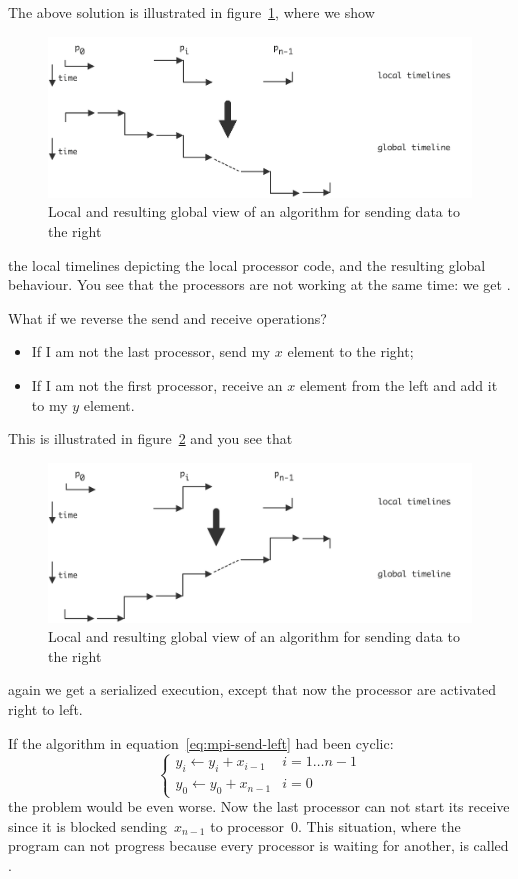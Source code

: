 The above solution is illustrated in figure~\ref{fig:wave_right_1},
where we show
\begin{figure}
  \includegraphics[scale=.14]{graphics/wave_right_1}
  \caption{Local and resulting global view of an algorithm for sending
    data to the right}
  \label{fig:wave_right_1}
\end{figure}
the local timelines depicting the local processor code, and the resulting
global behaviour. You see that the processors are not working at the
same time: we get .

What if we reverse the send and receive operations?
\begin{itemize}
\item If I am not the last processor, send my $x$ element to the
  right;
\item If I am not the first processor, receive an $x$ element from the
  left and add it to my $y$ element.
\end{itemize}
This is illustrated in figure~\ref{fig:wave_right_2} and you see that
\begin{figure}
  \includegraphics[scale=.14]{graphics/wave_right_2}
  \caption{Local and resulting global view of an algorithm for sending
    data to the right}
  \label{fig:wave_right_2}
\end{figure}
again we get a serialized execution, except that now the processor are
activated right to left.

If the algorithm in equation~\ref{eq:mpi-send-left} had been cyclic:
\begin{equation}
\begin{cases}
y_i\leftarrow y_i+x_{i-1}&i=1\ldots n-1\\ 
y_0\leftarrow y_0+x_{n-1}&i=0
\end{cases}
\label{eq:cyclic-add}
\end{equation}
the problem would be even worse. Now the last processor can not start
its receive since it is blocked sending~$x_{n-1}$ to processor~0. This
situation, where the program can not progress because every processor is
waiting for another, is called . 

